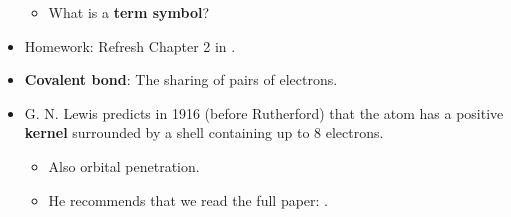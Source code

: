 \documentclass[../notes.tex]{subfiles}
\begin{document}
\begin{itemize}
\begin{itemize}
        \item What is a \textbf{term symbol}?
    \end{itemize}
    \item Homework: Refresh Chapter 2 in \textcite{bib:MiesslerFischerTarr}.
    \item \textbf{Covalent bond}: The sharing of pairs of electrons.
    \item G. N. Lewis predicts in 1916 (before Rutherford) that the atom has a positive \textbf{kernel} surrounded by a shell containing up to 8 electrons.
    \begin{itemize}
        \item Also orbital penetration.
        \item He recommends that we read the full paper: \textcite{bib:Lewis}.
    \end{itemize}
\end{itemize}
\end{document}
